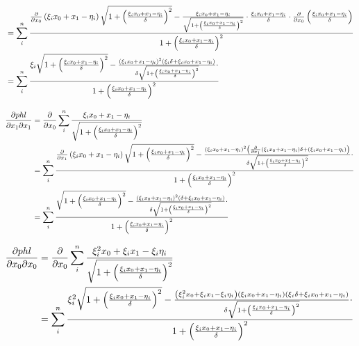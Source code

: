 \documentclass[paper=A3, 
   paper=landscape,]{scrartcl}
\begin{document}
\begin{align*}
& = \sum\limits_i^n \frac {\frac{\partial}{\partial x_0} \left( \xi_i x_0 + x_1 -\eta_i \right) \sqrt{ 1+ \left( \frac {\xi_i x_0 + x_1 -\eta_i} {\delta} \right)^2 }- \frac{ \xi_i x_0 + x_1 -\eta_i }{\sqrt{ 1+ \left( \frac {\xi_i x_0 + x_1 -\eta_i} {\delta} \right) ^2}}  \cdot  \frac{\xi_i x_0+x_1-\eta_i}{\delta}  \cdot  \frac{\partial}{\partial x_0} \left( \frac{\xi_i x_0+x_1-\eta_i}{\delta} \right) } {1+ \left( \frac {\xi_i x_0 + x_1 -\eta_i} {\delta} \right) ^2}\\
& = \sum\limits_i^n \frac {\xi_i \sqrt{ 1+ \left( \frac {\xi_i x_0 + x_1 -\eta_i} {\delta} \right)^2 } - \frac{\left( \xi_i x_0 + x_1 -\eta_i \right)^2 \left(\xi_i \delta  + \xi_i x_0+x_1-\eta_i\right)}{\delta \sqrt{ 1+ \left( \frac {\xi_i x_0 + x_1 -\eta_i} {\delta} \right) ^2}} \cdot } {1+ \left( \frac {\xi_i x_0 + x_1 -\eta_i} {\delta} \right)^2}\\
\end{align*}


\begin{align*}
\frac{\partial phl}{\partial x_1 \partial x_1} &= \frac{\partial}{\partial x_0} \sum\limits_i^n \frac {\xi_i x_0 + x_1 -\eta_i}{\sqrt{1+ \left( \frac {\xi_i x_0 + x_1 -\eta_i}{\delta}\right)^2  }}\\
& = \sum\limits_i^n \frac {\frac{\partial}{\partial x_1} \left( \xi_i x_0 + x_1 -\eta_i \right) \sqrt{ 1+ \left( \frac {\xi_i x_0 + x_1 -\eta_i} {\delta} \right)^2 } - \frac{\left( \xi_i x_0 + x_1 -\eta_i \right)^2\left( \frac{\partial}{\partial x_1} \left(\xi_i x_0+x_1-\eta_i \right) \delta  + \left( \xi_i x_0+x_1-\eta_i\right) \right)}{\delta \sqrt{ 1+ \left( \frac {\xi_i x_0 + x_1 -\eta_i} {\delta} \right) ^2}} \cdot } {1+ \left( \frac {\xi_i x_0 + x_1 -\eta_i} {\delta} \right)^2}\\
& = \sum\limits_i^n \frac {\sqrt{ 1+ \left( \frac {\xi_i x_0 + x_1 -\eta_i} {\delta} \right)^2 } - \frac{\left( \xi_i x_0 + x_1 -\eta_i \right)^2\left(\delta  + \xi_i x_0+x_1-\eta_i \right)}{\delta \sqrt{ 1+ \left( \frac {\xi_i x_0 + x_1 -\eta_i} {\delta} \right) ^2}} \cdot } {1+ \left( \frac {\xi_i x_0 + x_1 -\eta_i} {\delta} \right)^2}\\
\end{align*}

\begin{align*}
\frac{\partial phl}{\partial x_0 \partial x_0} &= \frac{\partial}{\partial x_0} \sum\limits_i^n \frac {\xi_i^2x_0 + \xi_ix_1 - \xi_i \eta_i}{\sqrt{1+ \left( \frac {\xi_i x_0 + x_1 -\eta_i}{\delta}\right)^2 }}\\
& = \sum\limits_i^n \frac {\xi_i^2 \sqrt{ 1+ \left( \frac {\xi_i x_0 + x_1 -\eta_i} {\delta} \right)^2 } - \frac{\left( \xi_i^2x_0 + \xi_ix_1 - \xi_i \eta_i \right)\left( \xi_i x_0 + x_1 -\eta_i \right) \left(\xi_i \delta  +  \xi_i x_0+x_1-\eta_i \right)}{\delta \sqrt{ 1+ \left( \frac {\xi_i x_0 + x_1 -\eta_i} {\delta} \right) ^2}} \cdot } {1+ \left( \frac {\xi_i x_0 + x_1 -\eta_i} {\delta} \right)^2}\\
\end{align*}
\end{document}
